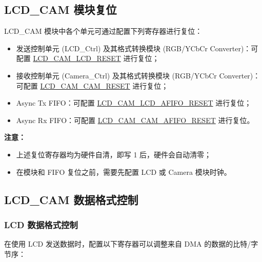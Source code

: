\documentclass[main\_\_CN.tex]{subfiles}
\begin{document}
\subsection{LCD\_CAM 模块复位} \label{module_reset}
LCD\_CAM 模块中各个单元可通过配置下列寄存器进行复位：
\begin{itemize}
\item 发送控制单元 (LCD\_Ctrl) 及其格式转换模块 (RGB/YCbCr Converter)：可配置 \hyperref[fielddesc:LCDCAMLCDRESET]{LCD\_CAM\_LCD\_RESET} 进行复位；
\item 接收控制单元 (Camera\_Ctrl) 及其格式转换模块 (RGB/YCbCr Converter)：可配置 \hyperref[fielddesc:LCDCAMCAMRESET]{LCD\_CAM\_CAM\_RESET} 进行复位；
\item Async Tx FIFO：可配置 \hyperref[fielddesc:LCDCAMLCDAFIFORESET]{LCD\_CAM\_LCD\_AFIFO\_RESET} 进行复位；
\item Async Rx FIFO：可配置 \hyperref[fielddesc:LCDCAMCAMAFIFORESET]{LCD\_CAM\_CAM\_AFIFO\_RESET} 进行复位。
\end{itemize}


{\bfseries 注意：}
\begin{itemize}
    \item 上述复位寄存器均为硬件自清，即写 1 后，硬件会自动清零；
    \item 在模块和 FIFO 复位之前，需要先配置 LCD 或 Camera 模块时钟。
\end{itemize}

\subsection{LCD\_CAM 数据格式控制}
\subsubsection{LCD 数据格式控制} \label{lcd_data_control}
在使用 LCD 发送数据时，配置以下寄存器可以调整来自 DMA 的数据的比特/字节序：
\end{document}
